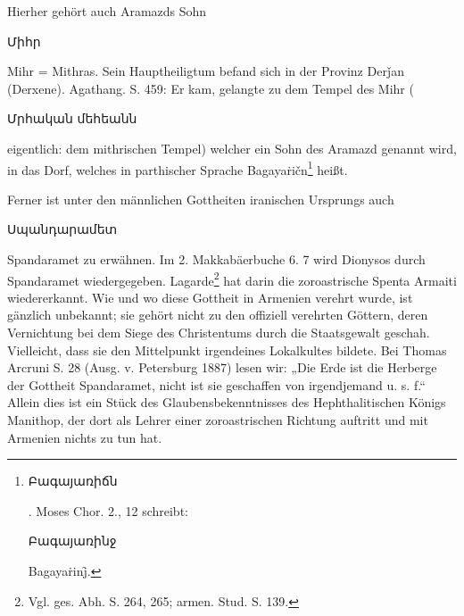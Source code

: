 \documentclass{article}
\begin{document}
Hierher gehört auch Aramazds Sohn \begin{armenian}Միհր\end{armenian} Mihr = Mithras. Sein Hauptheiligtum befand sich in der Provinz Derǰan (Derxene). Agathang. S. 459: Er kam, gelangte zu dem Tempel des Mihr (\begin{armenian}Մրհական մեհեանն\end{armenian} eigentlich: dem mithrischen Tempel) welcher ein Sohn des Aramazd genannt wird, in das Dorf, welches in parthischer Sprache Bagayaṙičn\footnote{\begin{armenian}Բագայառիճն\end{armenian}. Moses Chor. 2., 12 schreibt: \begin{armenian}Բագայառինջ\end{armenian} Bagayaṙinj̑.} heißt.

Ferner ist unter den männlichen Gottheiten iranischen Ursprungs auch \begin{armenian}Սպանդարամետ\end{armenian} Spandaramet zu erwähnen. Im 2. Makkabäerbuche 6. 7 wird Dionysos durch Spandaramet wiedergegeben. Lagarde\footnote{Vgl. ges. Abh. S. 264, 265; armen. Stud. S. 139.} hat darin die zoroastrische Spenta Armaiti wiedererkannt. Wie und wo diese Gottheit in Armenien verehrt wurde, ist gänzlich unbekannt; sie gehört nicht zu den offiziell verehrten Göttern, deren Vernichtung bei dem Siege des Christentums durch die Staatsgewalt geschah. Vielleicht, dass sie den Mittelpunkt irgendeines Lokalkultes bildete. Bei Thomas Arcruni S. 28 (Ausg. v. Petersburg 1887) lesen wir: „Die Erde ist die Herberge der Gottheit Spandaramet, nicht ist sie geschaffen von irgendjemand u. s. f.“ Allein dies ist ein Stück des Glaubensbekenntnisses des Hephthalitischen Königs Manithop, der dort als Lehrer einer zoroastrischen Richtung auftritt und mit Armenien nichts zu tun hat.
\end{document}
